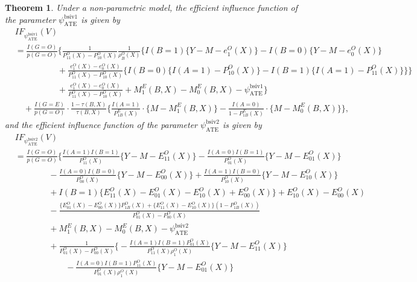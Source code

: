 \documentclass[10pt]{article}
\newtheorem{theorem}{Theorem}
\begin{document}
\begin{theorem}
\label{thm:IF:BSIV-1}
Under a non-parametric model, the efficient influence function of the parameter $\psi^{\text{bsiv1}}_{\text{ATE}}$ is given by
\begin{align*}
&IF_{\psi^{\text{bsiv1}}_{\text{ATE}}}(V)\\
&=\frac{I(G=O)}{p(G=O)}\Bigg\{\frac{1}{P_{11}^O(X)-P_{10}^O(X)}
\frac{1}{\rho_B^O(X)}\bigg\{I(B=1)\{Y-M-e_1^O(X)\}
-I(B=0)\{Y-M-e_0^O(X)\}\\
&\quad\quad\quad\quad\quad+\frac{e_1^O(X)-e_0^O(X)}{P_{11}^O(X)-P_{10}^O(X)}\big\{I(B=0)\{I(A=1)-P_{10}^O(X)\}-I(B=1)\{I(A=1)-P_{11}^O(X)\}\big\}\bigg\}\\
&\quad\quad\quad\quad\quad+\frac{e_1^O(X)-e_0^O(X)}{P_{11}^O(X)-P_{10}^O(X)}+M_{1}^{E}(B,X)-M_{0}^{E}(B,X)-\psi^{\text{bsiv1}}_{\text{ATE}}\Bigg\}\\
&\quad+\frac{I(G=E)}{p(G=O)}\cdot\frac{1-\tau(B,X)}{\tau(B,X)}\bigg\{\frac{I(A=1)}{P_{1B}^E(X)}\cdot\{M-M_{1}^{E}(B,X)\}-\frac{I(A=0)}{1-P_{1B}^E(X)}\cdot\{M-M_{0}^{E}(B,X)\}\bigg\}
,
\end{align*}
and the efficient influence function of the parameter $\psi^{\text{bsiv2}}_{\text{ATE}}$ is given by
\begin{align*}
&IF_{\psi^{\text{bsiv2}}_{\text{ATE}}}(V)\\
&=\frac{I(G=O)}{p(G=O)}\Bigg\{\frac{I(A=1)I(B=1)}{P_{11}^O(X)}\{Y-M-E_{11}^O(X)\}-\frac{I(A=0)I(B=1)}{P_{01}^O(X)}\{Y-M-E_{01}^O(X)\}\\
    &\ \ \ \ \ \ \ \ \ \ \ \ \ \ \ \ \ \ -\frac{I(A=0)I(B=0)}{P_{00}^O(X)}\{Y-M-E_{00}^O(X)\}+\frac{I(A=1)I(B=0)}{P_{10}^O(X)}\{Y-M-E_{10}^O(X)\}\\
    &\ \ \ \ \ \ \ \ \ \ \ \ \ \ \ \ \ \ +I(B=1)\{E_{11}^O(X)-E_{01}^O(X)-E_{10}^O(X)+E_{00}^O(X)\}+E_{10}^O(X)-E_{00}^O(X)\\
    &\ \ \ \ \ \ \ \ \ \ \ \ \ \ \ \ \ \ -\frac{\{E_{01}^O(X)-E_{00}^O(X)\}P_{1B}^O(X)+\{E_{11}^O(X)-E_{10}^O(X)\}(1-P_{1B}^O(X))}{P_{01}^O(X)-P_{00}^O(X)}\\
    &\ \ \ \ \ \ \ \ \ \ \ \ \ \ \ \ \ \ +M_1^E(B,X)-M_0^E(B,X)-\psi^{\text{bsiv2}}_{\text{ATE}}\\
    &\ \ \ \ \ \ \ \ \ \ \ \ \ \ \ \ \ \ +\frac{1}{P_{01}^O(X)-P_{00}^O(X)}\bigg\{-\frac{I(A=1)I(B=1)P_{01}^O(X)}{P_{11}^O(X)\rho_1^O(X)}\{Y-M-E_{11}^O(X)\}\\
    &~~~~~~~~~~~~~~~~~~~~~~~~~~~-\frac{I(A=0)I(B=1)P_{11}^O(X)}{P_{01}^O(X)\rho_1^O(X)}\{Y-M-E_{01}^O(X)\}\\

\end{align*}
\end{theorem}
\end{document}
